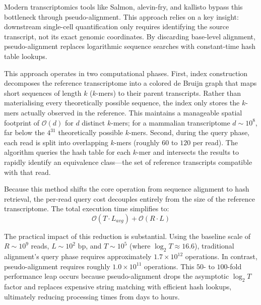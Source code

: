 Modern transcriptomics tools like Salmon, alevin-fry, and kallisto \cite{patro2017salmon, bray2016near, he2022alevin} bypass this bottleneck through pseudo-alignment. This approach relies on a key insight: downstream single-cell quantification only requires identifying the source transcript, not its exact genomic coordinates. By discarding base-level alignment, pseudo-alignment replaces logarithmic sequence searches with constant-time hash table lookups.

This approach operates in two computational phases. First, index construction decomposes the reference transcriptome into a colored de Bruijn graph that maps short sequences of length $k$ ($k$-mers) to their parent transcripts. Rather than materialising every theoretically possible sequence, the index only stores the $k$-mers actually observed in the reference. This maintains a manageable spatial footprint of $\mathcal{O}(d)$ for $d$ distinct $k$-mers; for a mammalian transcriptome $d \sim 10^8$, far below the $4^{31}$ theoretically possible $k$-mers. Second, during the query phase, each read is split into overlapping $k$-mers (roughly $60$ to $120$ per read). The algorithm queries the hash table for each $k$-mer and intersects the results to rapidly identify an equivalence class---the set of reference transcripts compatible with that read.

Because this method shifts the core operation from sequence alignment to hash retrieval, the per-read query cost decouples entirely from the size of the reference transcriptome. The total execution time simplifies to:
$$ \mathcal{O}(T \cdot L_{avg}) + \mathcal{O}(R \cdot L) $$

The practical impact of this reduction is substantial. Using the baseline scale of $R \sim 10^{9}$ reads, $L \sim 10^{2}\text{ bp}$, and $T \sim 10^5$ (where $\log_2 T \approx 16.6$), traditional alignment's query phase requires approximately $1.7 \times 10^{12}$ operations. In contrast, pseudo-alignment requires roughly $1.0 \times 10^{11}$ operations. This $50$- to $100$-fold performance leap occurs because pseudo-alignment drops the asymptotic $\log_2 T$ factor and replaces expensive string matching with efficient hash lookups, ultimately reducing processing times from days to hours.

